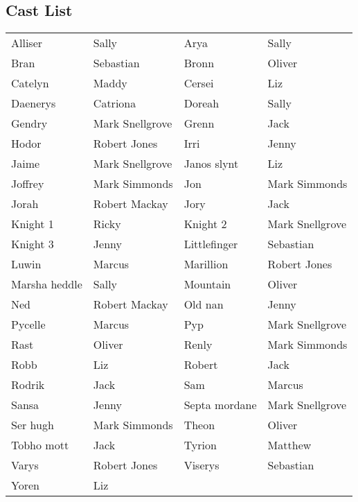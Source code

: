 \subsection*{Cast List}
\begin{tabular}{ll|ll}\\
Alliser & Sally &  Arya & Sally\\
Bran & Sebastian &  Bronn & Oliver\\
Catelyn & Maddy &  Cersei & Liz\\
Daenerys & Catriona &  Doreah & Sally\\
Gendry & Mark Snellgrove &  Grenn & Jack\\
Hodor & Robert Jones &  Irri & Jenny\\
Jaime & Mark Snellgrove &  Janos slynt & Liz\\
Joffrey & Mark Simmonds &  Jon & Mark Simmonds\\
Jorah & Robert Mackay &  Jory & Jack\\
Knight 1 & Ricky &  Knight 2 & Mark Snellgrove\\
Knight 3 & Jenny &  Littlefinger & Sebastian\\
Luwin & Marcus &  Marillion & Robert Jones\\
Marsha heddle & Sally &  Mountain & Oliver\\
Ned & Robert Mackay &  Old nan & Jenny\\
Pycelle & Marcus &  Pyp & Mark Snellgrove\\
Rast & Oliver &  Renly & Mark Simmonds\\
Robb & Liz &  Robert & Jack\\
Rodrik & Jack &  Sam & Marcus\\
Sansa & Jenny &  Septa mordane & Mark Snellgrove\\
Ser hugh & Mark Simmonds &  Theon & Oliver\\
Tobho mott & Jack &  Tyrion & Matthew\\
Varys & Robert Jones &  Viserys & Sebastian\\
Yoren & Liz &  \end{tabular}
